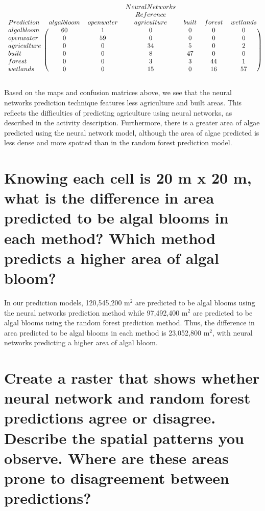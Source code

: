 \documentclass[11pt]{article}
\begin{document}
 \[
\begin{blockarray}{lcccccc}
& & & Neural Networks & & & \\
& & & Reference & & & \\
Prediction & algal bloom & open water & agriculture & built & forest & wetlands\\
\begin{block}{l(cccccc)}
algal bloom & 60 & 1 & 0 & 0 & 0 & 0 \\
open water & 0 & 59 & 0 & 0 & 0 & 0 \\
agriculture & 0 & 0 & 34 & 5 & 0 & 2  \\
built & 0 & 0 & 8 & 47 & 0 & 0  \\
forest & 0 & 0 & 3 & 3 & 44 & 1 \\
wetlands & 0 & 0 & 15 & 0 & 16 & 57 \\
\end{block}
\end{blockarray}
 \]

Based on the maps and confusion matrices above, we see that the neural networks prediction technique features less agriculture and built areas. This reflects the difficulties of predicting agriculture using neural networks, as described in the activity description. Furthermore, there is a greater area of algae predicted using the neural network model, although the area of algae predicted is less dense and more spotted than in the random forest prediction model.

\section{Knowing each cell is 20 m x 20 m, what is the difference in area predicted to be algal blooms in each method? Which method predicts a higher area of algal bloom?}

In our prediction models, 120,545,200 m$^2$ are predicted to be algal blooms using the neural networks prediction method while 97,492,400 m$^2$ are predicted to be algal blooms using the random forest prediction method. Thus, the difference in area predicted to be algal blooms in each method is 23,052,800 m$^2$, with neural networks predicting a higher area of algal bloom.

\section{Create a raster that shows whether neural network and random forest predictions agree or disagree. Describe the spatial patterns you observe. Where are these areas prone to disagreement between predictions?}
\end{document}
